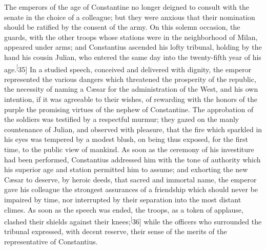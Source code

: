 The emperors of the age of Constantine no longer deigned to
consult with the senate in the choice of a colleague; but they
were anxious that their nomination should be ratified by the
consent of the army. On this solemn occasion, the guards, with
the other troops whose stations were in the neighborhood of
Milan, appeared under arms; and Constantius ascended his lofty
tribunal, holding by the hand his cousin Julian, who entered the
same day into the twenty-fifth year of his age.\textsuperscript[35] In a studied
speech, conceived and delivered with dignity, the emperor
represented the various dangers which threatened the prosperity
of the republic, the necessity of naming a Cæsar for the
administration of the West, and his own intention, if it was
agreeable to their wishes, of rewarding with the honors of the
purple the promising virtues of the nephew of Constantine. The
approbation of the soldiers was testified by a respectful murmur;
they gazed on the manly countenance of Julian, and observed with
pleasure, that the fire which sparkled in his eyes was tempered
by a modest blush, on being thus exposed, for the first time, to
the public view of mankind. As soon as the ceremony of his
investiture had been performed, Constantius addressed him with
the tone of authority which his superior age and station
permitted him to assume; and exhorting the new Cæsar to deserve,
by heroic deeds, that sacred and immortal name, the emperor gave
his colleague the strongest assurances of a friendship which
should never be impaired by time, nor interrupted by their
separation into the most distant climes. As soon as the speech
was ended, the troops, as a token of applause, clashed their
shields against their knees;\textsuperscript[36] while the officers who surrounded
the tribunal expressed, with decent reserve, their sense of the
merits of the representative of Constantius.



